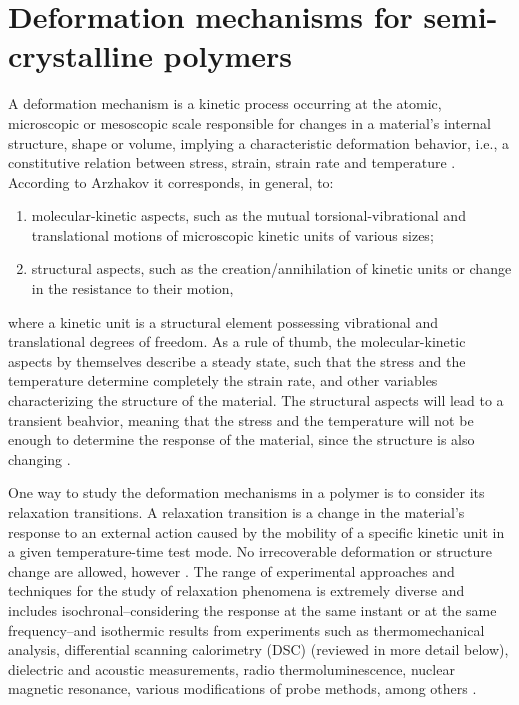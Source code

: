 \section{Deformation mechanisms for semi-crystalline polymers}
A deformation mechanism is a kinetic process occurring at the atomic, microscopic or mesoscopic scale responsible for changes in a material's internal structure, shape or volume, implying a characteristic deformation behavior, i.e., a constitutive relation between stress, strain, strain rate and temperature \citep{frostDeformationmechanismMapsPlasticity1982}.
According to Arzhakov \citep{arzhakovRelaxationPhysicalMechanical2019}  it corresponds, in general, to:
\begin{enumerate}
	\item molecular-kinetic aspects, such as the mutual torsional-vibrational and translational motions of microscopic kinetic units of various sizes;
	\item structural aspects, such as the creation/annihilation of kinetic units or change in the resistance to their motion,
\end{enumerate}
where a kinetic unit is a structural element possessing vibrational and translational degrees of freedom.
As a rule of thumb, the molecular-kinetic aspects by themselves describe a steady state, such that the stress and the temperature determine completely the strain rate, and other variables characterizing the structure of the material.
The structural aspects will lead to a transient beahvior, meaning that the stress and the temperature will not be enough to determine the response of the material, since the structure is also changing \citep{frostDeformationmechanismMapsPlasticity1982}.

One way to study the deformation mechanisms in a polymer is to consider its relaxation transitions.
A relaxation transition is a change in the material's response to an external action caused by the mobility of a specific kinetic unit in a given temperature-time test mode.
No irrecoverable deformation or structure change are allowed, however \citep{arzhakovRelaxationPhysicalMechanical2019}.
The range of experimental approaches and techniques for the study of relaxation phenomena is extremely diverse and includes isochronal--considering the response at the same instant or at the same frequency--and isothermic results from experiments such as thermomechanical analysis, differential scanning calorimetry (DSC)  (reviewed in more detail below), dielectric and acoustic measurements, radio thermoluminescence, nuclear magnetic resonance, various modifications of probe methods, among others \citep{ferryViscoelasticPropertiesPolymers1980, arzhakovRelaxationPhysicalMechanical2019}.

